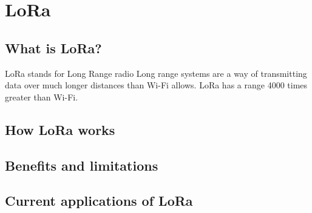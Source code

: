 \section{LoRa}

\subsection{What is LoRa?}

LoRa stands for Long Range radio
Long range systems are a way of transmitting data over much longer distances than
Wi-Fi allows. LoRa has a range 4000 times greater than Wi-Fi.

\subsection{How LoRa works}

\subsection{Benefits and limitations}

\subsection{Current applications of LoRa}